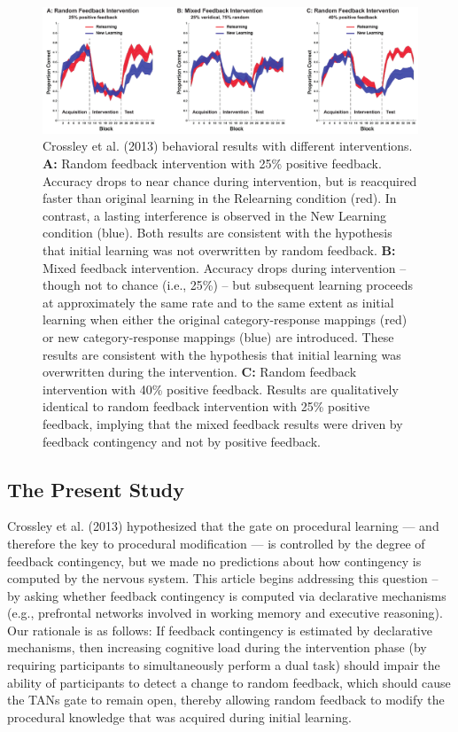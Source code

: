 \documentclass[man,apacite,draftfirst]{apa6}
\begin{document}
\begin{figure}[h]
\centering \includegraphics[width=1.0\textwidth]{../figures/fig_unlearning_results.pdf}
\caption{Crossley et al. (2013) behavioral results with different
  interventions. \textbf{A:} Random feedback intervention with 25\% positive
  feedback. Accuracy drops to near chance during intervention, but is reacquired
  faster than original learning in the Relearning condition (red). In contrast, a
  lasting interference is observed in the New Learning condition (blue). Both
  results are consistent with the hypothesis that initial learning was not
  overwritten by random feedback. \textbf{B:} Mixed feedback intervention.
  Accuracy drops during intervention -- though not to chance (i.e., 25\%) -- but
  subsequent learning proceeds at approximately the same rate and to the same
  extent as initial learning when either the original category-response mappings
  (red) or new category-response mappings (blue) are introduced. These results are
  consistent with the hypothesis that initial learning was overwritten during the
  intervention. \textbf{C:} Random feedback intervention with 40\% positive
  feedback. Results are qualitatively identical to random feedback intervention
  with 25\% positive feedback, implying that the mixed feedback results were
  driven by feedback contingency and not by positive feedback. }
  \label{fig:unlearning_data}
\end{figure}

\subsection*{The Present Study}
Crossley et al. (2013) hypothesized that the gate on procedural learning --- and
therefore the key to procedural modification --- is controlled by the degree of
feedback contingency, but we made no predictions about how contingency is
computed by the nervous system. This article begins addressing this question --
by asking whether feedback contingency is computed via declarative mechanisms
(e.g., prefrontal networks involved in working memory and executive reasoning).
Our rationale is as follows: If feedback contingency is estimated by declarative
mechanisms, then increasing cognitive load during the intervention phase (by
requiring participants to simultaneously perform a dual task) should impair the
ability of participants to detect a change to random feedback, which should
cause the TANs gate to remain open, thereby allowing random feedback to modify
the procedural knowledge that was acquired during initial learning.
\end{document}
